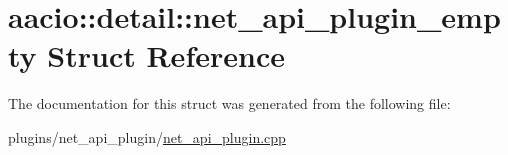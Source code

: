 \hypertarget{structaacio_1_1detail_1_1net__api__plugin__empty}{}\section{aacio\+:\+:detail\+:\+:net\+\_\+api\+\_\+plugin\+\_\+empty Struct Reference}
\label{structaacio_1_1detail_1_1net__api__plugin__empty}


The documentation for this struct was generated from the following file\+:\begin{DoxyCompactItemize}
\item 
plugins/net\+\_\+api\+\_\+plugin/\mbox{\hyperlink{net__api__plugin_8cpp}{net\+\_\+api\+\_\+plugin.\+cpp}}\end{DoxyCompactItemize}
